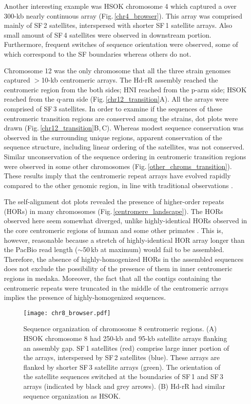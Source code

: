   Another interesting example was HSOK chromosome 4 which captured a over 300-kb nearly continuous array (Fig.\,\ref{chr4_browser}). This array was comprised mainly of SF\,2 satellites, interspersed with shorter SF\,1 satellite arrays. Also small amount of SF\,4 satellites were observed in downstream portion. Furthermore, frequent switches of sequence orientation were observed, some of which correspond to the SF boundaries whereas others do not.

  Chromosome 12 was the only chromosome that all the three strain genomes captured $>$10-kb centromeric arrays. The Hd-rR assembly reached the centromeric region from the both sides; HNI reached from the p-arm side; HSOK reached from the q-arm side (Fig.\,\ref{chr12_transition}A). All the arrays were comprised of SF\,3 satellites. In order to examine if the sequences of these centromeric transition regions are conserved among the strains, dot plots were drawn (Fig.\,\ref{chr12_transition}B,\,C). Whereas modest sequence conservation was observed in the surrounding unique regions, apparent conservation of the sequence structure, including linear ordering of the satellites, was not conserved. Similar unconservation of the sequence ordering in centromeric transition regions were observed in some other chromosomes (Fig.\,\ref{other_chroms_transition}). These results imply that the centromeric repeat arrays have evolved rapidly compared to the other genomic region, in line with traditional observations \cite{Willard1991}.

  The self-alignment dot plots revealed the presence of higher-order repeats (HORs) in many chromosomes (Fig.\,\ref{centromere_landscape}). The HORs observed here seem somewhat diverged, unlike highly-identical HORs observed in the core centromeric regions of human and some other primates \cite{Willard1987}. This is, however, reasonable because a stretch of highly-identical HOR array longer than the PacBio read length ($\sim$50\,kb at maximum) would fail to be assembled. Therefore, the absence of highly-homogenized HORs in the assembled sequences does not exclude the possibility of the presence of them in inner centromeric regions in medaka. Moreover, the fact that all the contigs containing the centromeric repeats were truncated in the middle of the centromeric arrays implies the presence of highly-homogenized sequences.


  \begin{figure*}
    \centering
    \texttt{[image: chr8\_browser.pdf]}
    \caption{
      Sequence organization of chromosome 8 centromeric regions. (A) HSOK chromosome 8 had 250-kb and 95-kb satellite arrays flanking an assembly gap. SF\,1 satellites (red) comprise large inner portion of the arrays, interspersed by SF\,2 satellites (blue). These arrays are flanked by shorter SF\,3 satellite arrays (green). The orientation of the satellite sequences switched at the boundaries of SF\,1 and SF\,3 arrays (indicated by black and grey arrows). (B) Hd-rR had similar sequence organization as HSOK.
    }
    \label{chr8_browser}
  \end{figure*}

